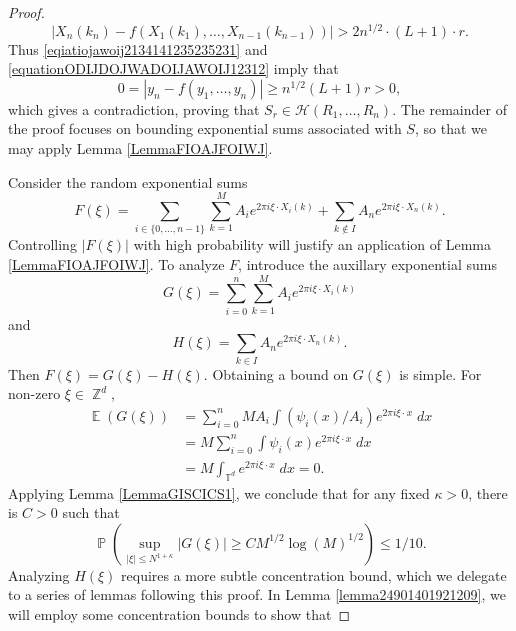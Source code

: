 \documentclass[dvipsnames,letterpaper,12pt]{article}
\numberwithin{equation}{section}
\DeclareMathOperator{\ZZ}{\mathbb{Z}}
\DeclareMathOperator{\TT}{\mathbb{T}}
\numberwithin{theorem}{section}
\DeclareMathOperator{\EE}{\mathbb{E}}
\DeclareMathOperator{\PP}{\mathbb{P}}
\begin{document}
\begin{proof}
    \begin{equation} \label{equationODIJDOJWADOIJAWOIJ12312}
        |X_n(k_n) - f(X_1(k_1),\dots,X_{n-1}(k_{n-1}))| > 2n^{1/2} \cdot (L+1) \cdot r.
    \end{equation}
    Thus \eqref{eqiatiojawoij2134141235235231} and \eqref{equationODIJDOJWADOIJAWOIJ12312} imply that
    \begin{equation}
        0 = |y_n - f(y_1,\dots,y_n)| \geq n^{1/2} (L+1) r > 0,
    \end{equation}
    which gives a contradiction, proving that $S_r \in \mathcal{H}(R_1,\dots,R_n)$. The remainder of the proof focuses on bounding exponential sums associated with $S$, so that we may apply Lemma \ref{LemmaFIOAJFOIWJ}.


    Consider the random exponential sums
    \[ F(\xi) = \sum_{i \in \{ 0, \dots, n-1 \}} \sum_{k = 1}^M A_i e^{2 \pi i \xi \cdot X_i(k)} + \sum_{k \not \in I} A_n e^{2 \pi i \xi \cdot X_n(k)}. \]
    Controlling $|F(\xi)|$ with high probability will justify an application of Lemma \ref{LemmaFIOAJFOIWJ}. To analyze $F$, introduce the auxillary exponential sums
    \[ G(\xi) = \sum_{i = 0}^n \sum_{k = 1}^M A_i e^{2 \pi i \xi \cdot X_i(k)} \]
    and
    \[ H(\xi) = \sum_{k \in I} A_n e^{2 \pi i \xi \cdot X_n(k)}. \]
    Then $F(\xi) = G(\xi) - H(\xi)$.
    Obtaining a bound on $G(\xi)$ is simple. For non-zero $\xi \in \ZZ^d$,
    \begin{equation}
    \begin{split}
        \EE(G(\xi)) &= \sum_{i = 0}^n M A_i \int (\psi_i(x) / A_i) e^{2 \pi i \xi \cdot x}\; dx\\
        &= M \sum_{i = 0}^n \int \psi_i(x) e^{2 \pi i \xi \cdot x}\; dx\\
        &= M \int_{\TT^d} e^{2 \pi i \xi \cdot x}\; dx = 0.
    \end{split}
    \end{equation}
    Applying Lemma \ref{LemmaGISCICS1}, we conclude that for any fixed $\kappa > 0$, there is $C > 0$ such that
    \begin{equation} \label{equationCOIACOIAJCPPPPP}
        \PP \left( \sup_{|\xi| \leq N^{1 + \kappa}} |G(\xi)| \geq C M^{1/2} \log(M)^{1/2} \right) \leq 1/10.
    \end{equation}
    Analyzing $H(\xi)$ requires a more subtle concentration bound, which we delegate to a series of lemmas following this proof. In Lemma \ref{lemma24901401921209}, we will employ some concentration bounds to show that

\end{proof}
\end{document}
